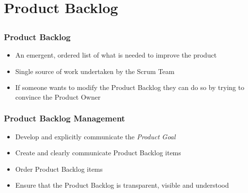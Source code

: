 \section{Product Backlog}
\subsection{}

\begin{frame}
	\frametitle{Product Backlog}
	\begin{itemize}
		\setlength\itemsep{0.7em}
		\item An emergent, ordered list of what is needed to improve the product
		\item Single source of work undertaken by the Scrum Team
		\item If someone wants to modify the Product Backlog they can do so by trying to convince the Product Owner
	\end{itemize}
\end{frame}

\begin{frame}
	\frametitle{Product Backlog Management}
	\begin{itemize}
		\setlength\itemsep{0.7em}
		\item Develop and explicitly communicate the \textit{Product Goal}
		\item Create and clearly communicate Product Backlog items
		\item Order Product Backlog items
		\item Ensure that the Product Backlog is transparent, visible and understood
	\end{itemize}
\end{frame}
